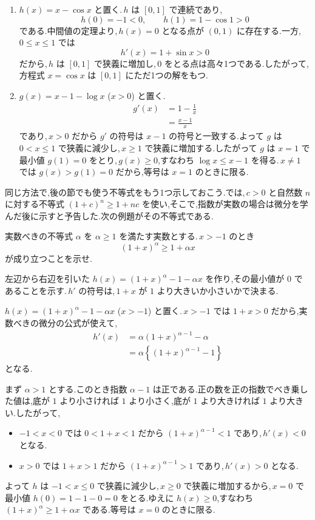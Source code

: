 \begin{enumerate}[label=(\arabic*),leftmargin=*]
 \item $h(x)=x-\cos x$ と置く.\,$h$ は $[0,1]$ で連続であり,
 \[
  h(0)=-1<0,\qquad h(1)=1-\cos1>0
 \]
 である.中間値の定理より,\,$h(x)=0$ となる点が $(0,1)$ に存在する.一方,\,$0\le x\le1$ では
 \[
  h'(x)=1+\sin x>0
 \]
 だから,\,$h$ は $[0,1]$ で狭義に増加し,\,$0$ をとる点は高々1つである.したがって,方程式 $x=\cos x$ は $[0,1]$ にただ1つの解をもつ.
 \item $g(x)=x-1-\log x$ ($x>0$) と置く.
 \begin{align*}
  g'(x)&=1-\frac1x\\
  &=\frac{x-1}{x}
 \end{align*}
 であり,\,$x>0$ だから $g'$ の符号は $x-1$ の符号と一致する.よって $g$ は $0<x\le1$ で狭義に減少し,\,$x\ge1$ で狭義に増加する.したがって $g$ は $x=1$ で最小値 $g(1)=0$ をとり,\,$g(x)\ge0$,すなわち $\log x\le x-1$ を得る.\,$x\ne1$ では $g(x)>g(1)=0$ だから,等号は $x=1$ のときに限る.
\end{enumerate}

同じ方法で,後の節でも使う不等式をもう1つ示しておこう.では,\,$c>0$ と自然数 $n$ に対する不等式 $(1+c)^n\ge1+nc$ を使い,そこで,指数が実数の場合は微分を学んだ後に示すと予告した.次の例題がその不等式である.

\begin{example}{実数べきの不等式}\label{例題:実数べきの不等式}
$\alpha$ を $\alpha\ge1$ を満たす実数とする.\,$x>-1$ のとき
\[
 (1+x)^\alpha\ge1+\alpha x
\]
が成り立つことを示せ.
\end{example}
左辺から右辺を引いた $h(x)=(1+x)^\alpha-1-\alpha x$ を作り,その最小値が $0$ であることを示す.\,$h'$ の符号は,\,$1+x$ が $1$ より大きいか小さいかで決まる.

$h(x)=(1+x)^\alpha-1-\alpha x$ ($x>-1$) と置く.\,$x>-1$ では $1+x>0$ だから,実数べきの微分の公式が使えて,
\begin{align*}
 h'(x)&=\alpha(1+x)^{\alpha-1}-\alpha\\
 &=\alpha\left\{(1+x)^{\alpha-1}-1\right\}
\end{align*}
となる.

まず $\alpha>1$ とする.このとき指数 $\alpha-1$ は正である.正の数を正の指数でべき乗した値は,底が $1$ より小さければ $1$ より小さく,底が $1$ より大きければ $1$ より大きい.したがって,
\begin{itemize}
 \item $-1<x<0$ では $0<1+x<1$ だから $(1+x)^{\alpha-1}<1$ であり,\,$h'(x)<0$ となる.
 \item $x>0$ では $1+x>1$ だから $(1+x)^{\alpha-1}>1$ であり,\,$h'(x)>0$ となる.
\end{itemize}
よって $h$ は $-1<x\le0$ で狭義に減少し,\,$x\ge0$ で狭義に増加するから,\,$x=0$ で最小値 $h(0)=1-1-0=0$ をとる.ゆえに $h(x)\ge0$,すなわち $(1+x)^\alpha\ge1+\alpha x$ である.等号は $x=0$ のときに限る.

